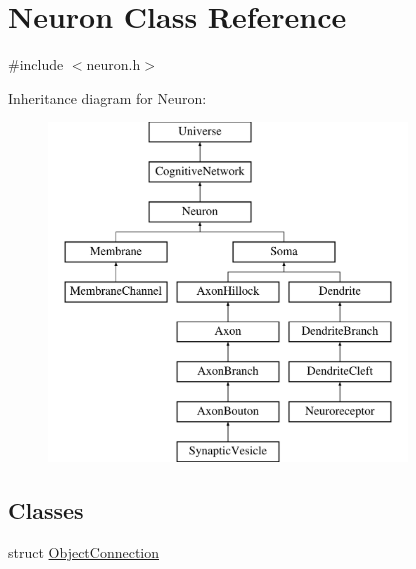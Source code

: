 \hypertarget{classNeuron}{}\section{Neuron Class Reference}
\label{classNeuron}


{\ttfamily \#include $<$neuron.\+h$>$}

Inheritance diagram for Neuron\+:\begin{figure}[H]
\begin{center}
\leavevmode
\includegraphics[height=9.000000cm]{classNeuron}
\end{center}
\end{figure}
\subsection*{Classes}
\begin{DoxyCompactItemize}
\item 
struct \mbox{\hyperlink{structNeuron_1_1ObjectConnection}{Object\+Connection}}
\end{DoxyCompactItemize}
